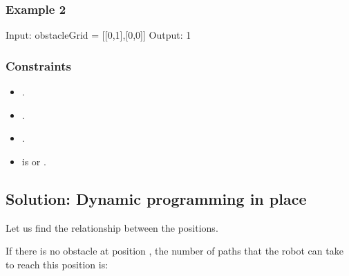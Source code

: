 \documentclass[letterpaper,12pt,english]{book}
\begin{document}
\subsubsection{Example 2}
\label{\detokenize{Dynamic_Programming/05_DP_63_Unique_Paths_II:example-2}}
\sphinxAtStartPar
{}

\begin{sphinxVerbatim}[commandchars=\\\{\}]
Input: obstacleGrid = [[0,1],[0,0]]
Output: 1
\end{sphinxVerbatim}


\subsubsection{Constraints}
\label{\detokenize{Dynamic_Programming/05_DP_63_Unique_Paths_II:constraints}}\begin{itemize}
\item {} 
\sphinxAtStartPar
{}.

\item {} 
\sphinxAtStartPar
{}.

\item {} 
\sphinxAtStartPar
{}.

\item {} 
\sphinxAtStartPar
{} is  or .

\end{itemize}


\subsection{Solution: Dynamic programming in place}
\label{\detokenize{Dynamic_Programming/05_DP_63_Unique_Paths_II:solution-dynamic-programming-in-place}}
\sphinxAtStartPar
Let us find the relationship between the positions.

\sphinxAtStartPar
If there is no obstacle at position , the number of paths  that the robot can take to reach this position is:
\end{document}
